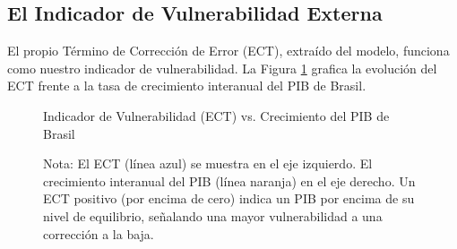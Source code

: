 \documentclass[12pt, a4paper]{article}
\begin{document}

\subsection{El Indicador de Vulnerabilidad Externa}
El propio Término de Corrección de Error (ECT), extraído del modelo, funciona como nuestro indicador de vulnerabilidad. La Figura \ref{fig:ect_vs_gdp} grafica la evolución del ECT frente a la tasa de crecimiento interanual del PIB de Brasil.

\begin{figure}[h!]
\centering
\caption{Indicador de Vulnerabilidad (ECT) vs. Crecimiento del PIB de Brasil}
\label{fig:ect_vs_gdp}
\caption*{Nota: El ECT (línea azul) se muestra en el eje izquierdo. El crecimiento interanual del PIB (línea naranja) en el eje derecho. Un ECT positivo (por encima de cero) indica un PIB por encima de su nivel de equilibrio, señalando una mayor vulnerabilidad a una corrección a la baja.}
\end{figure}

\end{document}
